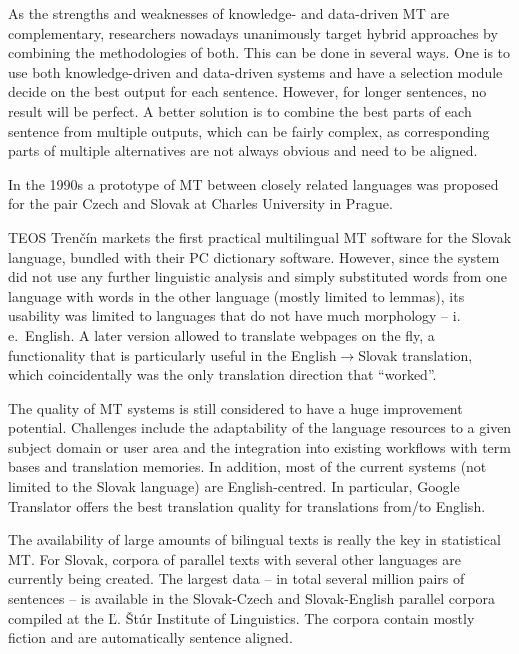 \begin{multicols}{2}
As the strengths and weaknesses of knowledge- and data-driven MT are complementary, researchers nowadays unanimously target hybrid approaches by combining the methodologies of both. This can be done in several ways. One is to use both knowledge-driven and data-driven systems and have a selection module decide on the best output for each sentence. However, for longer sentences, no result will be perfect. A better solution is to combine the best parts of each sentence from multiple outputs, which can be fairly complex, as corresponding parts of multiple alternatives are not always obvious and need to be aligned. 

In the 1990s a prototype of MT between closely related languages was proposed for the pair Czech and Slovak at Charles University in Prague.

TEOS Trenčín markets the first practical multilingual MT software for the Slovak language, bundled with their PC dictionary software. However, since the system did not use any further linguistic analysis and simply substituted words from one language with words in the other language (mostly limited to lemmas), its usability was limited to languages that do not have much morphology – i.\,e.~English. A later version allowed to translate webpages on the fly, a functionality that is particularly useful in the English$\rightarrow$Slovak translation, which coincidentally was the only translation direction that “worked”.

The quality of MT systems is still considered to have a huge improvement potential. Challenges include the adaptability of the language resources to a given subject domain or user area and the integration into existing workflows with term bases and translation memories. In addition, most of the current systems (not limited to the Slovak language) are English-centred. In particular, Google Translator offers the best translation quality for translations from/to English.


The availability of large amounts of bilingual texts is really the key in statistical MT. For Slovak, corpora of parallel texts with several other languages are currently being created. The largest data – in total several million pairs of sentences – is available in the Slovak-Czech and Slovak-English parallel corpora compiled at the Ľ. Štúr Institute of Linguistics. The corpora contain mostly fiction and are automatically sentence aligned.


\end{multicols}
